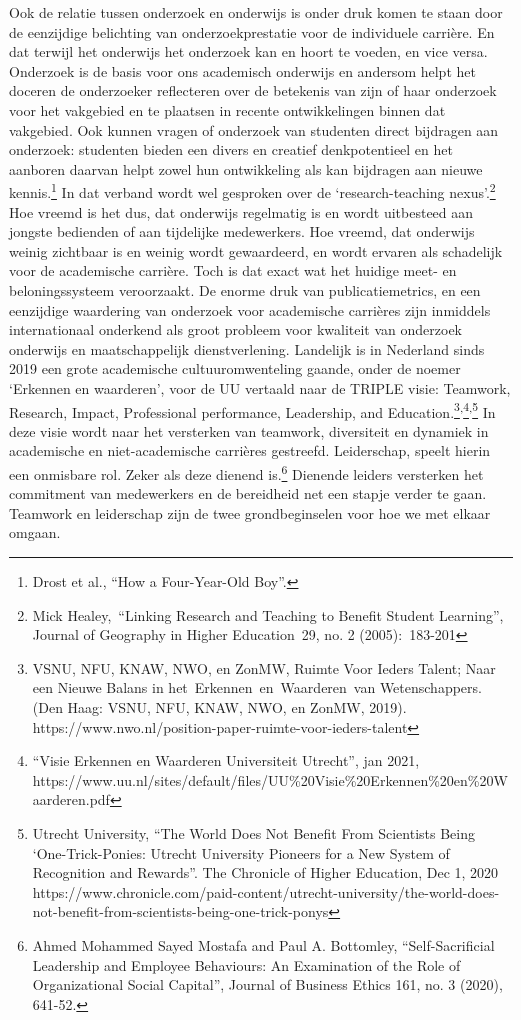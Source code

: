 \documentclass{jote-book}
\begin{document}
	Ook de relatie tussen onderzoek en onderwijs is onder druk komen te staan door de eenzijdige belichting van onderzoekprestatie voor de individuele carrière. En dat terwijl het onderwijs het onderzoek kan en hoort te voeden, en vice versa. Onderzoek is de basis voor ons academisch onderwijs en andersom helpt het doceren de onderzoeker reflecteren over de betekenis van zijn of haar onderzoek voor het vakgebied en te plaatsen in recente ontwikkelingen binnen dat vakgebied. Ook kunnen vragen of onderzoek van studenten direct bijdragen aan onderzoek: studenten bieden een divers en creatief denkpotentieel en het aanboren daarvan helpt zowel hun ontwikkeling als kan bijdragen aan nieuwe kennis.\footnote{Drost et al., “How a Four-Year-Old Boy”.} In dat verband wordt wel gesproken over de ‘research-teaching nexus'.\footnote{Mick Healey, “Linking Research and Teaching to Benefit Student Learning”, Journal of Geography in Higher Education 29, no. 2 (2005): 183-201} Hoe vreemd is het dus, dat onderwijs regelmatig is en wordt uitbesteed aan jongste bedienden of aan tijdelijke medewerkers. Hoe vreemd, dat onderwijs weinig zichtbaar is en weinig wordt gewaardeerd, en wordt ervaren als schadelijk voor de academische carrière. Toch is dat exact wat het huidige meet- en beloningssysteem veroorzaakt. De enorme druk van publicatiemetrics, en een eenzijdige waardering van onderzoek voor academische carrières zijn inmiddels internationaal onderkend als groot probleem voor kwaliteit van onderzoek onderwijs en maatschappelijk dienstverlening. Landelijk is in Nederland sinds 2019 een grote academische cultuuromwenteling gaande, onder de noemer ‘Erkennen en waarderen', voor de UU vertaald naar de TRIPLE visie: Teamwork, Research, Impact, Professional performance, Leadership, and Education.\footnote{VSNU, NFU, KNAW, NWO, en ZonMW, Ruimte Voor Ieders Talent; Naar een Nieuwe Balans in het Erkennen en Waarderen van Wetenschappers. (Den Haag: VSNU, NFU, KNAW, NWO, en ZonMW, 2019). https://www.nwo.nl/position-paper-ruimte-voor-ieders-talent}\textsuperscript{,}\footnote{“Visie Erkennen en Waarderen Universiteit Utrecht”, jan 2021, https://www.uu.nl/sites/default/files/UU\%20Visie\%20Erkennen\%20en\%20Waarderen.pdf}\textsuperscript{,}\footnote{Utrecht University, “The World Does Not Benefit From Scientists Being ‘One-Trick-Ponies: Utrecht University Pioneers for a New System of Recognition and Rewards”. The Chronicle of Higher Education, Dec 1, 2020 https://www.chronicle.com/paid-content/utrecht-university/the-world-does-not-benefit-from-scientists-being-one-trick-ponys} In deze visie wordt naar het versterken van teamwork, diversiteit en dynamiek in academische en niet-academische carrières gestreefd. Leiderschap, speelt hierin een onmisbare rol. Zeker als deze dienend is.\footnote{Ahmed Mohammed Sayed Mostafa and Paul A. Bottomley, “Self-Sacrificial Leadership and Employee Behaviours: An Examination of the Role of Organizational Social Capital”, Journal of Business Ethics 161, no. 3 (2020), 641-52.} Dienende leiders versterken het commitment van medewerkers en de bereidheid net een stapje verder te gaan. Teamwork en leiderschap zijn de twee grondbeginselen voor hoe we met elkaar omgaan.
\end{document}
